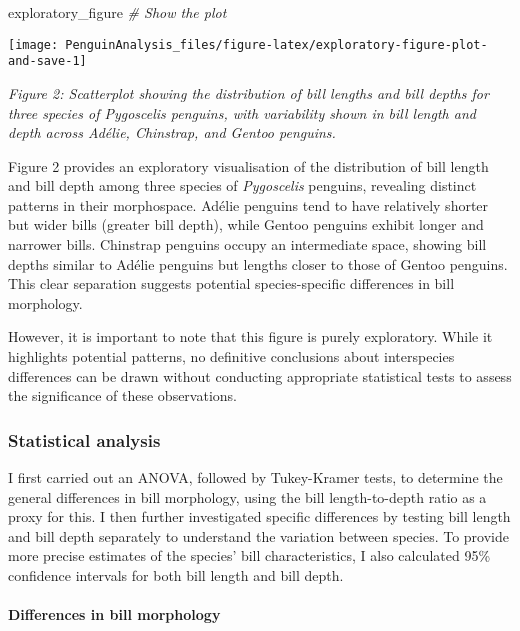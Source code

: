 \documentclass[
]{article}
\newenvironment{Shaded}{\begin{snugshade}}{\end{snugshade}}
\newcommand{\CommentTok}[1]{\textcolor[rgb]{0.56,0.35,0.01}{\textit{#1}}}
\newcommand{\NormalTok}[1]{#1}
\begin{document}
\begin{Shaded}
\begin{Highlighting}[]
\NormalTok{exploratory\_figure }\CommentTok{\# Show the plot}
\end{Highlighting}
\end{Shaded}

\begin{center}\texttt{[image: PenguinAnalysis\_files/figure-latex/exploratory-figure-plot-and-save-1]} \end{center}

\emph{Figure 2: Scatterplot showing the distribution of bill lengths and
bill depths for three species of \emph{Pygoscelis} penguins, with
variability shown in bill length and depth across Adélie, Chinstrap, and
Gentoo penguins.}

Figure 2 provides an exploratory visualisation of the distribution of
bill length and bill depth among three species of \emph{Pygoscelis}
penguins, revealing distinct patterns in their morphospace. Adélie
penguins tend to have relatively shorter but wider bills (greater bill
depth), while Gentoo penguins exhibit longer and narrower bills.
Chinstrap penguins occupy an intermediate space, showing bill depths
similar to Adélie penguins but lengths closer to those of Gentoo
penguins. This clear separation suggests potential species-specific
differences in bill morphology.

However, it is important to note that this figure is purely exploratory.
While it highlights potential patterns, no definitive conclusions about
interspecies differences can be drawn without conducting appropriate
statistical tests to assess the significance of these observations.

\subsubsection{Statistical analysis}\label{statistical-analysis}

I first carried out an ANOVA, followed by Tukey-Kramer tests, to
determine the general differences in bill morphology, using the bill
length-to-depth ratio as a proxy for this. I then further investigated
specific differences by testing bill length and bill depth separately to
understand the variation between species. To provide more precise
estimates of the species' bill characteristics, I also calculated 95\%
confidence intervals for both bill length and bill depth.

\paragraph{Differences in bill
morphology}\label{differences-in-bill-morphology}
\end{document}
